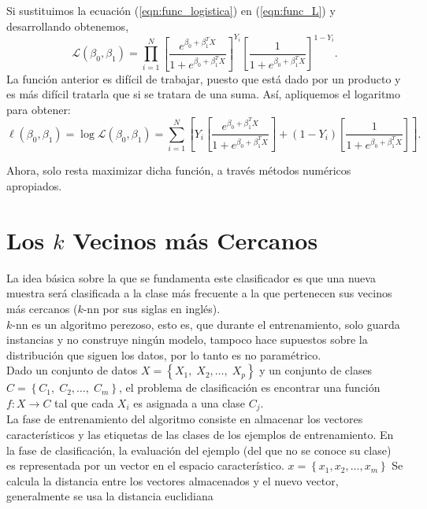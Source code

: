 \documentclass[11pt,letterpaper,reqno]{article}
\begin{document}
Si sustituimos la ecuación (\ref{eqn:func_logistica}) en (\ref{eqn:func_L}) y desarrollando obtenemos,
$$
\mathcal{L}(\beta_{0}, \beta_{1}) =  \prod_{i=1}^{N} \left[ \frac{e^{\beta_0 + \beta_1^{T} X}}{1+e^{\beta_0 + \beta_1^{T}X}} \right]^{Y_i} \left[\frac{1}{1+e^{\beta_0 + \beta_1^{T}X}} \right]^{1-Y_i}.
$$
La función anterior es difícil de trabajar, puesto que está dado por un producto y es más difícil tratarla que si se tratara de una suma. Así, apliquemos el logaritmo para obtener:
$$
\ell(\beta_{0}, \beta_{1}) = \log\mathcal{L}(\beta_{0}, \beta_{1}) = \sum_{i=1}^{N}\left[ Y_i\left[ \frac{e^{\beta_0 + \beta_1^{T} X}}{1+e^{\beta_0 + \beta_1^{T}X}} \right] +  (1-Y_i)\left[\frac{1}{1+e^{\beta_0 + \beta_1^{T}X}} \right] \right].
$$

Ahora, solo resta maximizar dicha función, a través métodos numéricos apropiados. 

\section{Los $k$ Vecinos más Cercanos}

La idea básica sobre la que se fundamenta este clasificador es que una nueva muestra será clasificada a la clase más frecuente a la que pertenecen sus vecinos más cercanos ($k$-nn por sus siglas en inglés).\\

$k$-nn es un algoritmo perezoso, esto es, que durante el entrenamiento, solo guarda instancias y no construye ningún modelo, tampoco hace supuestos sobre la distribución que siguen los datos, por lo tanto es no paramétrico.\\

Dado un conjunto de datos $ X= \left\lbrace X_1,\;X_2, \ldots ,\; X_p \right\rbrace $ y un conjunto de clases $ C= \left\lbrace C_1,\;C_2, \ldots ,\; C_m \right\rbrace $, el  problema de clasificación es encontrar una función $ f:X \longrightarrow C $ tal que cada $ X_i $ es asignada a una clase $ C_j $.\\

La fase de entrenamiento del algoritmo consiste en almacenar los vectores característicos y las etiquetas de las clases de los ejemplos de entrenamiento.  En la fase de clasificación, la evaluación del ejemplo (del que no se conoce su clase) es representada por un vector en el espacio característico.
$ x = \left\lbrace x_1,x_2, ... , x_m \right\rbrace $
Se calcula la distancia entre los vectores almacenados y el nuevo vector, generalmente se usa la distancia euclidiana
\end{document}
